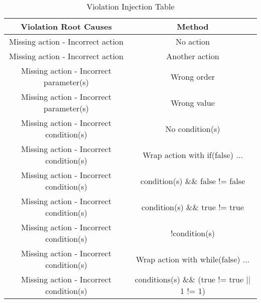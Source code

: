 \begin{table}[h]
\begin{tabular}{|c|c|}
\hline
\textbf{Violation Root Causes} & \textbf{ Method } \\
\hline
Missing action - Incorrect action & No action \\
\hline
Missing action - Incorrect action & Another action \\
\hline
Missing action - Incorrect parameter(s) & Wrong order \\
\hline
Missing action - Incorrect parameter(s) & Wrong value \\
\hline
Missing action - Incorrect condition(s) & No condition(s) \\
\hline
Missing action - Incorrect condition(s) & Wrap action with if(false){ ... } \\
\hline
Missing action - Incorrect condition(s) & condition(s) \&\& false != false \\
\hline
Missing action - Incorrect condition(s) & condition(s) \&\& true != true \\
\hline
Missing action - Incorrect condition(s) & !condition(s)  \\
\hline
Missing action - Incorrect condition(s) & Wrap action with while(false){ ... }  \\
\hline
Missing action - Incorrect condition(s) & conditions(s) \&\& (true != true || 1 != 1)  \\
\hline
\end{tabular}

\caption{Violation Injection Table}
\label{tab:vio-inj}

\end{table}